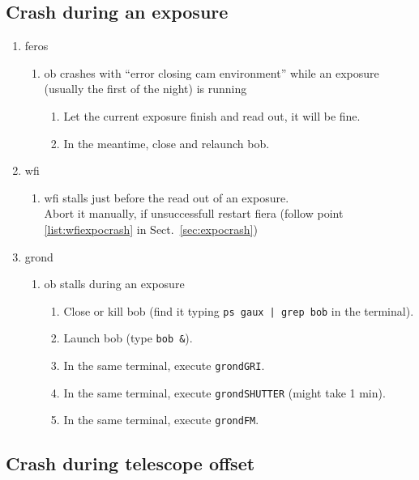 \documentclass[11pt,fleqn]{book} %
\begin{document}
\subsection{Crash during an exposure}
\begin{enumerate}
  \item \gls{feros} 
    \begin{enumerate}
       \item \gls{ob} crashes with ``error closing cam environment''
          while an  exposure (usually the first of the night) is running
          \begin{enumerate}
            \item Let the current exposure finish and read out, it will be fine.
            \item In the meantime, close and relaunch \gls{bob}.
          \end{enumerate}
    \end{enumerate}
  \item \gls{wfi}
    \begin{enumerate}
       \item \gls{wfi} stalls just before the read out of an exposure.\\
             Abort it manually, if unsuccessfull restart \gls{fiera} (follow point \ref{list:wfiexpocrash} in Sect.~\ref{sec:expocrash})
    \end{enumerate}
  \item \gls{grond}
    \begin{enumerate}
       \item \gls{ob} stalls during an exposure
	      \begin{enumerate}
             \item Close or kill {bob} (find it typing \texttt{ps gaux | grep bob} in the terminal).
             \item Launch \gls{bob} (type \texttt{bob \&}).
             \item In the same terminal, execute \texttt{grondGRI}.
             \item In the same terminal, execute \texttt{grondSHUTTER} (might take 1 min).
             \item In the same terminal, execute \texttt{grondFM}.
             \end{enumerate}
  \end{enumerate}
\end{enumerate}

\subsection{Crash during telescope offset}
\end{document}
